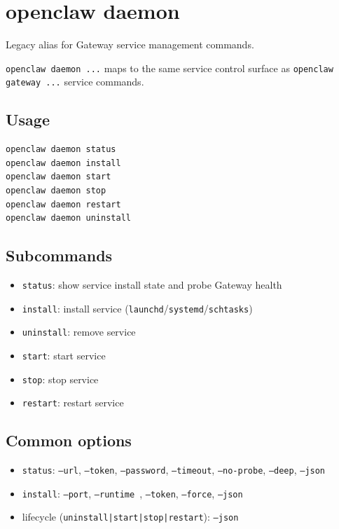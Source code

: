 \section{openclaw daemon}


Legacy alias for Gateway service management commands.

\texttt{openclaw daemon ...} maps to the same service control surface as \texttt{openclaw gateway ...} service commands.

\subsection{Usage}


\begin{lstlisting}[language=bash]
openclaw daemon status
openclaw daemon install
openclaw daemon start
openclaw daemon stop
openclaw daemon restart
openclaw daemon uninstall
\end{lstlisting}


\subsection{Subcommands}


\begin{itemize}
  \item \texttt{status}: show service install state and probe Gateway health
  \item \texttt{install}: install service (\texttt{launchd}/\texttt{systemd}/\texttt{schtasks})
  \item \texttt{uninstall}: remove service
  \item \texttt{start}: start service
  \item \texttt{stop}: stop service
  \item \texttt{restart}: restart service
\end{itemize}


\subsection{Common options}


\begin{itemize}
  \item \texttt{status}: \texttt{--url}, \texttt{--token}, \texttt{--password}, \texttt{--timeout}, \texttt{--no-probe}, \texttt{--deep}, \texttt{--json}
  \item \texttt{install}: \texttt{--port}, \texttt{--runtime }, \texttt{--token}, \texttt{--force}, \texttt{--json}
  \item lifecycle (\texttt{uninstall|start|stop|restart}): \texttt{--json}
\end{itemize}


